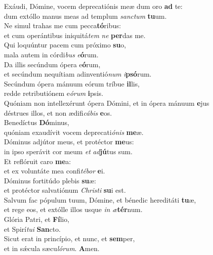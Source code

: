 \evenverse Exáudi, Dómine, vocem deprecatiónis meæ dum oro \textbf{ad} te:~\*\\
\evenverse dum extóllo manus meas ad templum \textit{san}\textit{ctum} \textbf{tu}um.\\
\oddverse Ne simul trahas me cum pecca\textbf{tó}ribus:~\*\\
\oddverse et cum operántibus iniquitá\textit{tem} \textit{ne} \textbf{per}das me.\\
\evenverse Qui loquúntur pacem cum próximo \textbf{su}o,~\*\\
\evenverse mala autem in córdi\textit{bus} \textit{e}\textbf{ó}rum.\\
\oddverse Da illis secúndum ópera e\textbf{ó}rum,~\*\\
\oddverse et secúndum nequítiam adinventió\textit{num} \textit{i}\textbf{psó}rum.\\
\evenverse Secúndum ópera mánuum eórum tríbue \textbf{il}lis,~\*\\
\evenverse redde retributiónem e\textit{ó}\textit{rum} \textbf{i}psis.\\
\oddverse Quóniam non intellexérunt ópera Dómini, et in ópera mánuum \textbf{e}jus~\*\\
\oddverse déstrues illos, et non ædifi\textit{cá}\textit{bis} \textbf{e}os.\\
\evenverse Benedíctus \textbf{Dó}minus,~\*\\
\evenverse quóniam exaudívit vocem deprecati\textit{ó}\textit{nis} \textbf{me}æ.\\
\oddverse Dóminus adjútor meus, et protéctor \textbf{me}us:~\*\\
\oddverse in ipso sperávit cor meum \textit{et} \textit{ad}\textbf{jú}tus sum.\\
\evenverse Et reflóruit caro \textbf{me}a:~\*\\
\evenverse et ex voluntáte mea confi\textit{té}\textit{bor} \textbf{e}i.\\
\oddverse Dóminus fortitúdo plebis \textbf{su}æ:~\*\\
\oddverse et protéctor salvatiónum \textit{Chri}\textit{sti} \textbf{su}i est.\\
\evenverse Salvum fac pópulum tuum, Dómine, et bénedic hereditáti \textbf{tu}æ,~\*\\
\evenverse et rege eos, et extólle illos usque \textit{in} \textit{æ}\textbf{tér}num.\\
\oddverse Glória Patri, et \textbf{Fí}lio,~\*\\
\oddverse et Spirí\textit{tu}\textit{i} \textbf{San}cto.\\
\evenverse Sicut erat in princípio, et nunc, et \textbf{sem}per,~\*\\
\evenverse et in sǽcula sæcu\textit{ló}\textit{rum}. \textbf{A}men.\\
